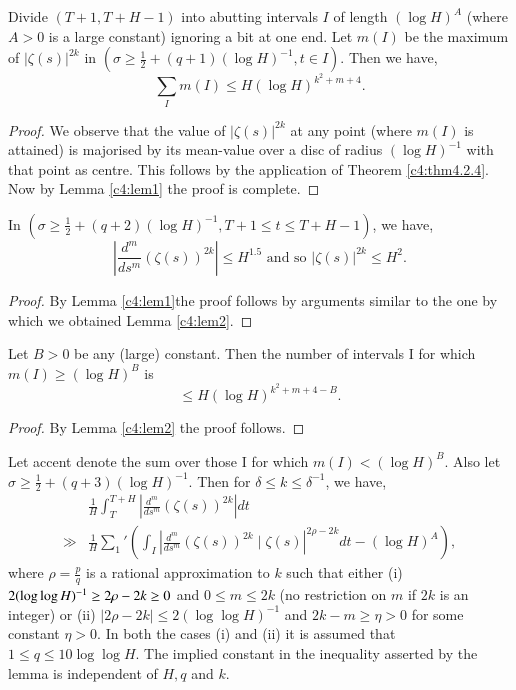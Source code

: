 \begin{lem}\label{c4:lem2}
Divide $(T+1, T + H -1)$ into abutting intervals $I$ of length $(\log H)^A$ (where $A > 0$ is a large constant) ignoring a bit at one end. Let $m(I)$ be the maximum of $|\zeta(s)|^{2k}$ in $(\sigma \geq \frac{1}{2} + (q+1) (\log H)^{-1} , t \in I)$. Then we have,
\begin{equation*}
\sum\limits_I m(I) \leq H (\log H)^{k^2 + m + 4}. \tag{4.2.4}\label{c4:eq4.2.4}
\end{equation*}
\end{lem}

\begin{proof}
We observe that the value of $|\zeta(s)|^{2k}$ at any point (where $m(I)$ is attained) is majorised by its mean-value over a disc of radius $(\log H)^{-1}$ with that point as centre. This follows by the application of Theorem \ref{c4:thm4.2.4}. Now by Lemma \ref{c4:lem1} the proof is complete.
\end{proof}

\begin{lem}\label{c4:lem3}
In $(\sigma \geq \frac{1}{2} + (q+2) (\log H)^{-1}, T + 1 \leq t \leq T + H-1)$, we have,
$$
|\frac{d^m}{ds^m} (\zeta(s))^{2k}| \leq H^{1.5} \text{ and so } |\zeta(s)|^{2k} \leq H^2.
$$
\end{lem}

\begin{proof}
By Lemma \ref{c4:lem1}\pageoriginale the proof follows by arguments similar to the one by which we obtained Lemma \ref{c4:lem2}.
\end{proof}

\begin{lem}\label{c4:lem4}
Let $B > 0$ be any (large) constant. Then the number of intervals I for which $m(I)\geq (\log H)^B$ is
$$
\leq H (\log H)^{k^2 + m + 4 - B}.
$$
\end{lem}

\begin{proof}
By Lemma \ref{c4:lem2} the proof follows.
\end{proof}

\begin{lem}\label{c4:lem5}
Let accent denote the sum over those I for which $m(I) < (\log H)^B$. Also let $\sigma \geq \frac{1}{2} + (q+3) (\log H)^{-1}$. Then for $\delta \leq k \leq \delta^{-1}$, we have, 
\begin{align*}
& \frac{1}{H} \int^{T+H}_T |\frac{d^m}{ds^m} (\zeta(s))^{2k}|  dt\\
\gg & \frac{1}{H} \sum_1' \left(\int_I |\frac{d^m}{ds^m} (\zeta(s))^{2k} \mid \zeta(s)|^{2\rho - 2k} dt - (\log H)^A \right), \tag{4.2.5}\label{c4:eq4.2.5}
\end{align*}
where $\rho =\frac{p}{q}$ is a rational approximation to $k$ such that either (i) $2(\log\break\log H)^{-1} \geq 2 \rho - 2k \geq 0$ and $0 \leq m \leq 2k$ (no restriction  on $m$ if $2k$ is an integer) or (ii) $|2\rho - 2k | \leq 2 (\log \log H)^{-1}$ and $2k - m \geq \eta > 0$ for some constant $\eta > 0$. In both the cases (i) and (ii) it is assumed that $1 \leq q \leq 10 \log \log H$. The implied constant in the inequality asserted by the lemma is independent of $H,q$ and $k$.
\end{lem}

